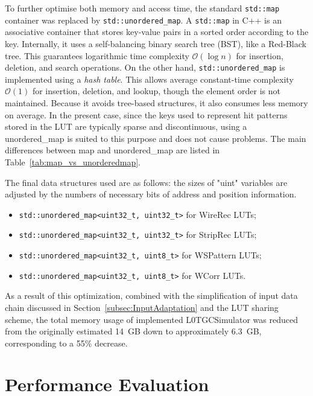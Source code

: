 To further optimise both memory and access time, the standard \texttt{std::map} container was replaced by \texttt{std::unordered\_map}. A \texttt{std::map} in C++ is an associative container that stores key-value pairs in a sorted order according to the key. Internally, it uses a self-balancing binary search tree (BST), like a Red-Black tree. This guarantees logarithmic time complexity $\mathcal{O}(\log n)$ for insertion, deletion, and search operations. On the other hand, \texttt{std::unordered\_map} is implemented using a \textit{hash table}. This allows average constant-time complexity $\mathcal{O}(1)$ for insertion, deletion, and lookup, though the element order is not maintained. Because it avoids tree-based structures, it also consumes less memory on average. In the present case, since the keys used to represent hit patterns stored in the LUT are typically sparse and discontinuous, using a unordered\_map is suited to this purpose and does not cause problems. The main differences between map and unordered\_map are listed in Table~\ref{tab:map_vs_unorderedmap}.


The final data structures used are as follows: the sizes of "uint" variables are adjusted by the numbers of necessary bits of address and position information.
\begin{itemize}
  \item \texttt{std::unordered\_map<uint32\_t, uint32\_t>} for WireRec LUTs;
  \item \texttt{std::unordered\_map<uint32\_t, uint32\_t>} for StripRec LUTs;
  \item \texttt{std::unordered\_map<uint32\_t, uint8\_t>}  for WSPattern LUTs;
  \item \texttt{std::unordered\_map<uint32\_t, uint8\_t>}  for WCorr LUTs.
\end{itemize}

As a result of this optimization, combined with the simplification of input data chain discussed in Section~\ref{subsec:InputAdaptation} and the LUT sharing scheme, the total memory usage of implemented L0TGCSimulator was reduced from the originally estimated 14~GB down to approximately 6.3~GB, corresponding to a 55\% decrease.

\section{Performance Evaluation} \label{sec:L0MuonS1TGCPerformance}
